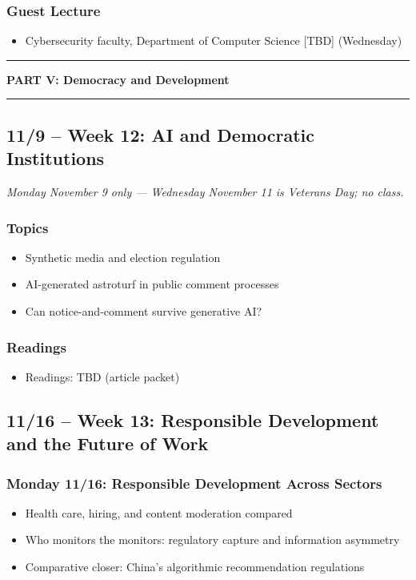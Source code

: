 \documentclass[12pt]{article}
\begin{document}
    \subsubsection*{Guest Lecture}
        \begin{itemize}
            \item Cybersecurity faculty, Department of Computer Science [TBD] (Wednesday)
        \end{itemize}

\bigskip
\noindent\rule{\textwidth}{0.6pt}
\begin{center}\textbf{PART V: Democracy and Development}\end{center}
\noindent\rule{\textwidth}{0.6pt}

\subsection*{11/9 -- Week 12: AI and Democratic Institutions}
\emph{Monday November 9 only --- Wednesday November 11 is Veterans Day; no class.}
    \subsubsection*{Topics}
        \begin{itemize}
            \item Synthetic media and election regulation
            \item AI-generated astroturf in public comment processes
            \item Can notice-and-comment survive generative AI?
        \end{itemize}
    \subsubsection*{Readings}
        \begin{itemize}
            \item Readings: TBD (article packet)
        \end{itemize}

\subsection*{11/16 -- Week 13: Responsible Development and the Future of Work}
    \subsubsection*{Monday 11/16: Responsible Development Across Sectors}
        \begin{itemize}
            \item Health care, hiring, and content moderation compared
            \item Who monitors the monitors: regulatory capture and information asymmetry
            \item Comparative closer: China's algorithmic recommendation regulations
        \end{itemize}
\end{document}
